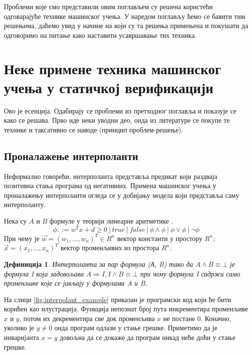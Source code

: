\documentclass[a4paper]{article}
\newtheorem{definic}{Дефиниција}
\begin{document}
{Проблеми које смо представили овим поглављем су решена користећи одговарајуће технике машинског учења. У наредом поглављу ћемо се бавити тим решењима, даћемо увид у начине на који су та решења примењена и покушати да одговоримо на питање како наставити усавршавање тих техника.

\section{Неке примене техника машинског учења у статичкој верификацији}
\color{blue}
Ово је есенција. Одабирају се проблеми из претходног поглавља и показује се
како се решава. Прво иде неки уводни део, онда из литературе се покупе те технике
и таксативно се наводе (принцип проблем-решење).
\color{black}
\subsection{Проналажење интерполанти}
\label{ssec:interpolant}

Неформално говорећи, интерполанта представља предикат који раздваја позитивна стања програма
од негативних. Примена машинског учења у проналажењу интерполанти огледа се у добијању модела
који представља саму интерполанту.

Нека су $A$ и $B$ формуле у теорији линеарне аритметике \cite{Kroening2008}.
\begin{equation}
\phi ::= w^Tx + d \geq 0 \ | \ true \ | \ false \ | \ \phi \land \phi \ | \ \phi \lor \phi \ | \ \neg \phi
\end{equation}
При чему је $\vec{w} = (w_1, ..., w_n)^T \in R^n$ вектор константи у простору $R^n$; $\vec{x} = (x_1, ..., x_n)^T$
вектор променљивих из простора $R^n$.

\begin{definic}
Интерполанта за пар формула (А, B) тако да $A \land B \equiv \bot$ је формула I која задовољава $A \Rightarrow I, I \land B \equiv \bot$
при чему формула I садржи само променљиве које се јављају у формулама A и B.
\end{definic}

На слици \ref{fig:interpolant_example} приказан је програмски код који ће бити корићен као илустрација.
Функција непознат број пута инкрементира променљиве $x$ и $y$, потом их декрементира све док променљива $x$
не постане 0. Коначно, уколико је $y \neq 0$ онда програм одлази у стање грешке.
Приметимо да је инваријанта $x = y$ довољна да се докаже да програм никад неће доћи у стање грешке.

}
\end{document}
